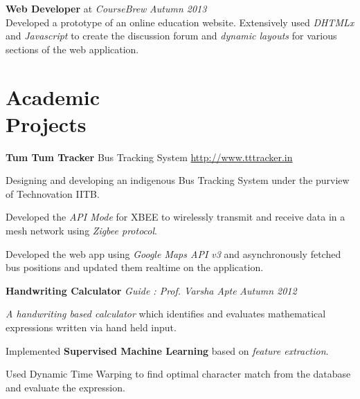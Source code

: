 \documentclass[margin,11pt]{resume}
\begin{document}
\begin{resume}
\textbf{Web Developer} at \emph{CourseBrew} \hfill \emph{Autumn 2013} \\
Developed a prototype of an online education website. Extensively used \emph{DHTMLx} and \emph{Javascript} to create the discussion forum and \emph{dynamic layouts} for various sections of the web application.

\section{\mysidestyle Academic\\Projects}

\textbf{Tum Tum Tracker} \hfill Bus Tracking System \hfill
    \url{http://www.tttracker.in}
\begin{list2}
\item Designing and developing an indigenous Bus Tracking System under the purview of Technovation IITB.
\item Developed the \emph{API Mode} for XBEE to wirelessly transmit and receive data in a mesh network using \emph{Zigbee protocol}.
\item Developed the web app using \emph{Google Maps API v3} and asynchronously fetched bus positions and updated them realtime  on the application.
\end{list2}

\textbf{Handwriting Calculator} \hfill
    \textsl{Guide : Prof. Varsha Apte} \hfill \emph{Autumn 2012}
\begin{list2}
\item \emph{A handwriting based calculator} which identifies and evaluates mathematical expressions written via hand held input.
\item Implemented \textbf{Supervised Machine Learning} based on \emph{feature extraction}. 
\item Used Dynamic Time Warping to find optimal character match from the database and evaluate the expression.
\end{list2}


\end{resume}
\end{document}
